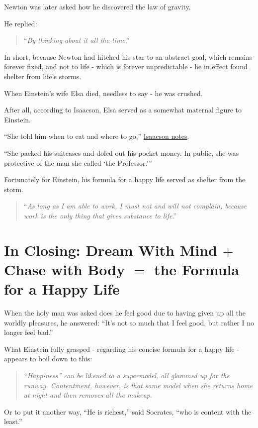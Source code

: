 \documentclass{book}
\numberwithin{equation}{section}
\begin{document}
%
Newton was later asked how he discovered the law of gravity.

He replied:
\begin{quotation}
    ``\textit{By thinking about it all the time}.''
\end{quotation}
In short, because Newton had hitched his star to an abstract goal, which remains forever fixed, and not to life - which is forever unpredictable - he in effect found shelter from life's storms.

%
When Einstein's wife Elsa died, needless to say - he was crushed.

After all, according to Isaacson, Elsa served as a somewhat maternal figure to Einstein.

%
``She told him when to eat and where to go,'' \href{https://onlinereadfreenovel.com/walter-isaacson/page,171,42091-walter_isaacson_great_innovators_e-book_boxed_set.html}{Isaacson notes}.

``She packed his suitcases and doled out his pocket money. In public, she was protective of the man she called `the Professor.'''

%
Fortunately for Einstein, his formula for a happy life served as shelter from the storm.

\begin{quotation}
    ``\textit{As long as I am able to work, I must not and will not complain, because work is the only thing that gives substance to life}.''
\end{quotation}

\section{In Closing: Dream With Mind $+$ Chase with Body $=$ the Formula for a Happy Life}
When the holy man was asked does he feel good due to having given up all the worldly pleasures, he answered: ``It's not so much that I feel good, but rather I no longer feel bad.''

%
What Einstein fully grasped - regarding his concise formula for a happy life - appears to boil down to this:

\begin{quotation}
    \textit{``Happiness'' can be likened to a supermodel, all glammed up for the runway. Contentment, however, is that same model when she returns home at night and then removes all the makeup}.
\end{quotation}
Or to put it another way, ``He is richest,'' said Socrates, ``who is content with the least.''
\end{document}
